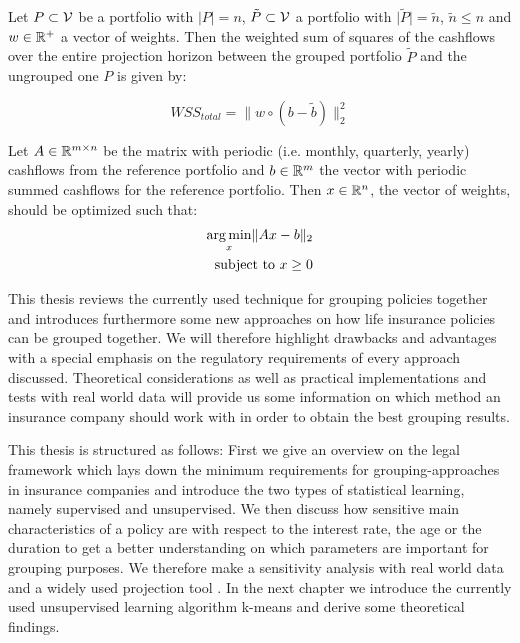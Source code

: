 \begin{definition}
	Let $P \subset \mathcal{V}$ be a portfolio with $\vert P \vert = n$, $\tilde{P} \subset \mathcal{V}$  a portfolio with $\vert \tilde{P} \vert = \tilde{n}$, $\tilde{n} \leq n$ and $w \in \mathbb{R}^+$ a vector of weights. Then the weighted sum of squares of the cashflows over the entire projection horizon between the grouped portfolio $\tilde{P}$ and the ungrouped one $P$ is given by: 
	
	\begin{equation*}
		WSS_{total} = \lVert w \circ (b - \tilde{b})\lVert_2^2
	\end{equation*}
	
\end{definition}

\begin{definition}
	Let $A \in \mathbb{R}^{m \times n}$ be the matrix with periodic (i.e. monthly, quarterly, yearly) cashflows from the reference portfolio and $b \in \mathbb{R}^m$ the vector with periodic summed cashflows for the reference portfolio. Then $x \in \mathbb{R}^n$, the vector of weights, should be optimized such that:  
	\begin{align*}
		\operatorname*{arg\,min}_x \lVert Ax -b \rVert_2 \\
		\text{subject to } x \geq 0
	\end{align*}
\end{definition}







This thesis reviews the currently used technique for grouping policies together and introduces furthermore some new approaches on how life insurance policies can be grouped together. We will therefore highlight drawbacks and advantages with a special emphasis on the regulatory requirements of every approach discussed. Theoretical considerations as well as practical implementations and tests with real world data will provide us some information on which method an insurance company should work with in order to obtain the best grouping results.  

This thesis is structured as follows: First we give an overview on the legal framework which lays down the minimum requirements for grouping-approaches in insurance companies and introduce the two types of statistical learning, namely supervised and unsupervised. We then discuss how sensitive main characteristics of a policy are with respect to the interest rate, the age or the duration to get a better understanding on which parameters are important for grouping purposes. We therefore make a sensitivity analysis with real world data and a widely used projection tool . In the next chapter we introduce the currently used unsupervised learning algorithm k-means and derive some theoretical findings. 



